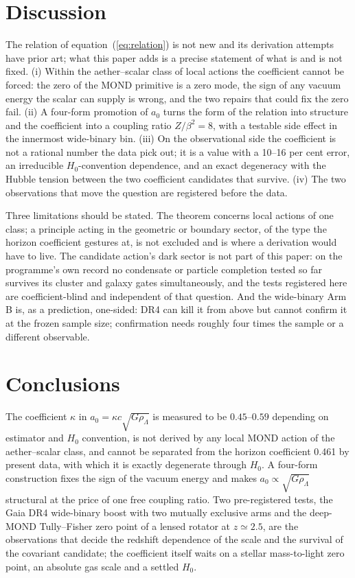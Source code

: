 \documentclass[fleqn,usenatbib]{mnras}
\begin{document}
\section{Discussion}
The relation of equation~(\ref{eq:relation}) is not new and its derivation attempts have prior art; what this paper adds is a precise statement of what is and is not fixed. (i) Within the aether--scalar class of local actions the coefficient cannot be forced: the zero of the MOND primitive is a zero mode, the sign of any vacuum energy the scalar can supply is wrong, and the two repairs that could fix the zero fail. (ii) A four-form promotion of $a_0$ turns the form of the relation into structure and the coefficient into a coupling ratio $Z/\beta^2=8$, with a testable side effect in the innermost wide-binary bin. (iii) On the observational side the coefficient is not a rational number the data pick out; it is a value with a 10--16 per cent error, an irreducible $H_0$-convention dependence, and an exact degeneracy with the Hubble tension between the two coefficient candidates that survive. (iv) The two observations that move the question are registered before the data.

Three limitations should be stated. The theorem concerns local actions of one class; a principle acting in the geometric or boundary sector, of the type the horizon coefficient gestures at, is not excluded and is where a derivation would have to live. The candidate action's dark sector is not part of this paper: on the programme's own record no condensate or particle completion tested so far survives its cluster and galaxy gates simultaneously, and the tests registered here are coefficient-blind and independent of that question. And the wide-binary Arm B is, as a prediction, one-sided: DR4 can kill it from above but cannot confirm it at the frozen sample size; confirmation needs roughly four times the sample or a different observable.

\section{Conclusions}
The coefficient $\kappa$ in $a_0=\kappa c\sqrt{G\rho_\Lambda}$ is measured to be $0.45$--$0.59$ depending on estimator and $H_0$ convention, is not derived by any local MOND action of the aether--scalar class, and cannot be separated from the horizon coefficient 0.461 by present data, with which it is exactly degenerate through $H_0$. A four-form construction fixes the sign of the vacuum energy and makes $a_0\propto\sqrt{G\rho_\Lambda}$ structural at the price of one free coupling ratio. Two pre-registered tests, the Gaia DR4 wide-binary boost with two mutually exclusive arms and the deep-MOND Tully--Fisher zero point of a lensed rotator at $z\simeq2.5$, are the observations that decide the redshift dependence of the scale and the survival of the covariant candidate; the coefficient itself waits on a stellar mass-to-light zero point, an absolute gas scale and a settled $H_0$.
\end{document}
